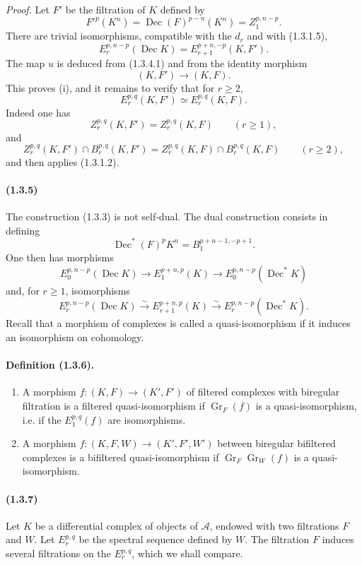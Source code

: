 \documentclass[10pt]{article}
\newcommand{\Gr}{\operatorname{Gr}}
\newcommand{\calA}{\mathcal A}
\newcommand{\iso}{\xrightarrow{\sim}}
\newcommand{\Dec}{\operatorname{Dec}}
\begin{document}
\emph{Proof.} Let $F'$ be the filtration of $K$ defined by
\[
F'^p(K^n)=\Dec(F)^{p-n}(K^n)=Z_1^{p,n-p}.
\]
There are trivial isomorphisms, compatible with the $d_r$ and with (1.3.1.5),
\[
\tag{1.3.4.1}
E_r^{p,n-p}(\Dec K)=E_{r+1}^{p+n,-p}(K,F').
\]
The map $u$ is deduced from (1.3.4.1) and from the identity morphism
\[
(K,F')\longrightarrow(K,F).
\]
This proves (i), and it remains to verify that for $r\ge2$,
\[
E_r^{p,q}(K,F')\simeq E_r^{p,q}(K,F).
\]
Indeed one has
\[
Z_r^{p,q}(K,F')=Z_r^{p,q}(K,F)\qquad(r\ge1),
\]
and
\[
Z_r^{p,q}(K,F')\cap B_r^{p,q}(K,F')=Z_r^{p,q}(K,F)\cap B_r^{p,q}(K,F)\qquad(r\ge2),
\]
and then applies (1.3.1.2).

\paragraph{(1.3.5)} The construction (1.3.3) is not self-dual. The dual construction consists in defining
\[
\Dec^*(F)^pK^n=B_1^{p+n-1,-p+1}.
\]
One then has morphisms
\[
E_0^{p,n-p}(\Dec K)\longrightarrow E_1^{p+n,p}(K)\longrightarrow E_0^{p,n-p}(\Dec^*K)
\]
and, for $r\ge1$, isomorphisms
\[
E_r^{p,n-p}(\Dec K)\iso E_{r+1}^{p+n,p}(K)\iso E_r^{p,n-p}(\Dec^*K).
\]
Recall that a morphism of complexes is called a quasi-isomorphism if it induces an isomorphism on cohomology.

\paragraph{Definition (1.3.6).}
\begin{enumerate}[label=(\roman*)]
\item A morphism $f:(K,F)\to(K',F')$ of filtered complexes with biregular filtration is a filtered quasi-isomorphism if $\Gr_F(f)$ is a quasi-isomorphism, i.e. if the $E_1^{p,q}(f)$ are isomorphisms.
\item A morphism $f:(K,F,W)\to(K',F',W')$ between biregular bifiltered complexes is a bifiltered quasi-isomorphism if $\Gr_F\Gr_W(f)$ is a quasi-isomorphism.
\end{enumerate}

\paragraph{(1.3.7)} Let $K$ be a differential complex of objects of $\calA$, endowed with two filtrations $F$ and $W$. Let $E_r^{p,q}$ be the spectral sequence defined by $W$. The filtration $F$ induces several filtrations on the $E_r^{p,q}$, which we shall compare.
\end{document}
